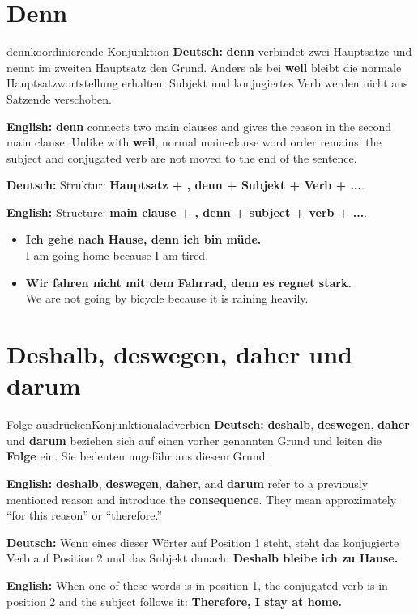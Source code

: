 \documentclass[a4paper,11pt]{article}
\newcommand{\GermanText}[1]{\textbf{Deutsch: }#1\par}
\newcommand{\EnglishText}[1]{{\small\color{SoftGray}\textbf{English: }#1\par}}
\newcommand{\ExampleItem}[2]{\item \textbf{#1}\\{\small\color{SoftGray}#2}}
\begin{document}
    \section{Denn}

        \begin{grammarentry}{denn}{koordinierende Konjunktion}
            \GermanText{\textbf{denn} verbindet zwei Hauptsätze und nennt im zweiten Hauptsatz den Grund. Anders als bei \textbf{weil} bleibt die normale Hauptsatzwortstellung erhalten: Subjekt und konjugiertes Verb werden nicht ans Satzende verschoben.}
            \EnglishText{\textbf{denn} connects two main clauses and gives the reason in the second main clause. Unlike with \textbf{weil}, normal main-clause word order remains: the subject and conjugated verb are not moved to the end of the sentence.}

            \GermanText{Struktur: \textbf{Hauptsatz + , denn + Subjekt + Verb + ...}.}
            \EnglishText{Structure: \textbf{main clause + , denn + subject + verb + ...}.}
        \end{grammarentry}

        \begin{exbox}
            \begin{itemize}
                \ExampleItem{Ich gehe nach Hause, denn ich bin müde.}{I am going home because I am tired.}
                \ExampleItem{Wir fahren nicht mit dem Fahrrad, denn es regnet stark.}{We are not going by bicycle because it is raining heavily.}
            \end{itemize}
        \end{exbox}

    \section{Deshalb, deswegen, daher und darum}

        \begin{grammarentry}{Folge ausdrücken}{Konjunktionaladverbien}
            \GermanText{\textbf{deshalb}, \textbf{deswegen}, \textbf{daher} und \textbf{darum} beziehen sich auf einen vorher genannten Grund und leiten die \textbf{Folge} ein. Sie bedeuten ungefähr \glqq aus diesem Grund\grqq.}
            \EnglishText{\textbf{deshalb}, \textbf{deswegen}, \textbf{daher}, and \textbf{darum} refer to a previously mentioned reason and introduce the \textbf{consequence}. They mean approximately ``for this reason'' or ``therefore.''}

            \GermanText{Wenn eines dieser Wörter auf Position 1 steht, steht das konjugierte Verb auf Position 2 und das Subjekt danach: \textbf{Deshalb bleibe ich zu Hause.}}
            \EnglishText{When one of these words is in position 1, the conjugated verb is in position 2 and the subject follows it: \textbf{Therefore, I stay at home.}}
        \end{grammarentry}
\end{document}

